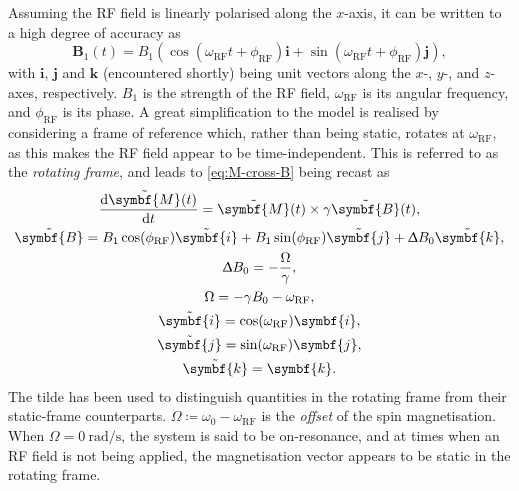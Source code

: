 Assuming the \ac{RF} field is linearly polarised along the $x$-axis, it can be
written to a high degree of accuracy as
\begin{equation}
    \symbf{B}_1(t) = B_1\left(
        \cos(\omega_{\text{RF}} t + \phi_{\text{RF}}) \symbf{i} +
        \sin(\omega_{\text{RF}} t + \phi_{\text{RF}}) \symbf{j}
    \right),
\end{equation}
with $\symbf{i}$, $\symbf{j}$ and $\symbf{k}$ (encountered shortly) being unit
vectors along the $x$-, $y$-, and $z$-axes, respectively. $B_1$ is the strength
of the \ac{RF} field, $\omega_{\text{RF}}$ is its angular frequency, and
$\phi_{\text{RF}}$ is its phase.
A great simplification to the model is realised by considering a frame
of reference which, rather than being static, rotates at $\omega_{\text{RF}}$,
as this makes the \ac{RF} field appear to be time-independent. This is referred
to as the \emph{rotating frame}, and leads to \cref{eq:M-cross-B} being recast
as
\begin{subequations}
    \begin{gather}
        \frac{\mathrm{d}\tilde{\symbf{M}}(t)}{\mathrm{d}t} = \tilde{\symbf{M}}(t) \times \gamma \tilde{\symbf{B}}(t),\\
        \tilde{\symbf{B}} =
            B_1 \cos(\phi_{\text{RF}}) \tilde{\symbf{i}} +
            B_1 \sin(\phi_{\text{RF}}) \tilde{\symbf{j}} +
            \Updelta B_0 \tilde{\symbf{k}},\\
        \Updelta B_0 = -\frac{\Omega}{\gamma},\\
        \Omega = -\gamma B_0 - \omega_{\text{RF}},\\
        \tilde{\symbf{i}} = \cos(\omega_{\text{RF}}) \symbf{i},\\
        \tilde{\symbf{j}} = \sin(\omega_{\text{RF}}) \symbf{j},\\
        \tilde{\symbf{k}} = \symbf{k}.
    \end{gather}%
    \label{eq:rot-frame}%
\end{subequations}%
The tilde has been used to distinguish quantities in the rotating frame from
their static-frame counterparts.
$\Omega \coloneq \omega_0 - \omega_{\text{RF}}$ is the \emph{offset} of the spin
magnetisation. When $\Omega = \qty{0}{\radian\per\second}$, the system is said to
be on-resonance, and at times when an \ac{RF} field is not being applied, the
magnetisation vector appears to be static in the rotating frame.

